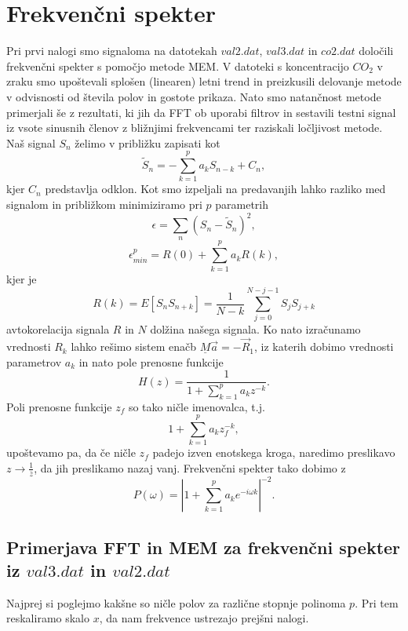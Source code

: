\documentclass[11pt, a4paper]{article}
\begin{document}
\section{Frekvenčni spekter}
Pri prvi nalogi smo signaloma na datotekah $val2.dat$, $val3.dat$ in $co2.dat$ določili frekvenčni spekter s pomočjo metode MEM. V datoteki s koncentracijo $CO_2$ v zraku smo upoštevali splošen (linearen) letni trend in preizkusili delovanje metode v odvisnosti od števila polov in gostote prikaza. Nato smo natančnost metode primerjali še z rezultati, ki jih da FFT ob uporabi filtrov in sestavili testni signal iz vsote sinusnih členov z bližnjimi frekvencami ter raziskali ločljivost metode.\newline
Naš signal $S_n$ želimo v približku zapisati kot
\begin{equation}
\widetilde{S}_n = -\sum_{k=1}^p a_k S_{n-k} + C_n,
\end{equation}
kjer $C_n$ predstavlja odklon. Kot smo izpeljali na predavanjih lahko razliko med signalom in približkom minimiziramo pri $p$ parametrih
\begin{equation}
\epsilon = \sum_n (S_n - \widetilde{S}_n)^2,
\end{equation}
\begin{equation}
\epsilon_{min}^p = R(0) + \sum_{k=1}^p a_k R(k),
\end{equation}
kjer je 
\begin{equation}
R(k) = E[S_nS_{n+k}] = \frac{1}{N-k} \sum_{j=0}^{N-j-1} S_j S_{j+k}
\end{equation}
avtokorelacija signala $R$ in $N$ dolžina našega signala. Ko nato izračunamo vrednosti $R_k$ lahko rešimo sistem enačb $\underline{M}\vec{a} = -\vec{R}_1$, iz katerih dobimo vrednosti parametrov $a_k$ in nato pole prenosne funkcije
\begin{equation}
H(z) = \frac{1}{1+\sum_{k=1}^{p} a_k z^{-k}}.
\end{equation}
Poli prenosne funkcije $z_f$ so tako ničle imenovalca, t.j.
\begin{equation}
1+\sum_{k=1}^{p} a_k z_f^{-k},
\end{equation}
upoštevamo pa, da če ničle $z_f$ padejo izven enotskega kroga, naredimo preslikavo $z \rightarrow \frac{1}{\bar{z}}$, da jih preslikamo nazaj vanj.\newline
Frekvenčni spekter tako dobimo z 
\begin{equation}
P(\omega) = |1 + \sum_{k=1}^p a_k e^{-i\omega k }|^{-2}.
\end{equation}
\subsection{Primerjava FFT in MEM za frekvenčni spekter iz $val3.dat$ in $val2.dat$}
Najprej si poglejmo kakšne so ničle polov za različne stopnje polinoma $p$. Pri tem reskaliramo skalo $x$, da nam frekvence ustrezajo prejšni nalogi.
\newline
\end{document}
